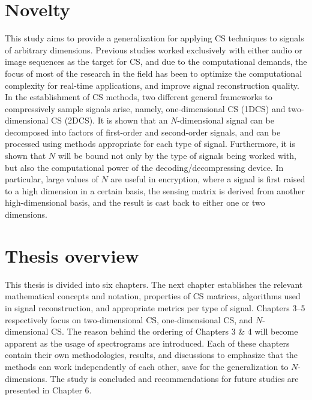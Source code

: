 \section{Novelty}
\label{sec:novel}
This study aims to provide a generalization for applying CS techniques to signals of arbitrary dimensions. Previous studies worked exclusively with either audio or image sequences as the target for CS, and due to the computational demands, the focus of most of the research in the field has been to optimize the computational complexity for real-time applications, and improve signal reconstruction quality. In the establishment of CS methods, two different general frameworks to compressively sample signals arise, namely, one-dimensional CS (1DCS) and two-dimensional CS (2DCS). It is shown that an $N$-dimensional signal can be decomposed into factors of first-order and second-order signals, and can be processed using methods appropriate for each type of signal. Furthermore, it is shown that $N$ will be bound not only by the type of signals being worked with, but also the computational power of the decoding/decompressing device. In particular, large values of $N$ are useful in encryption, where a signal is first raised to a high dimension in a certain basis, the sensing matrix is derived from another high-dimensional basis, and the result is cast back to either one or two dimensions.


\section{Thesis overview}
\label{sec:overview}
This thesis is divided into six chapters. The next chapter establishes the relevant mathematical concepts and notation, properties of CS matrices, algorithms used in signal reconstruction, and appropriate metrics per type of signal. Chapters 3--5 respectively focus on two-dimensional CS, one-dimensional CS, and $N$-dimensional CS. The reason behind the ordering of Chapters 3 \& 4 will become apparent as the usage of spectrograms are introduced. Each of these chapters contain their own methodologies, results, and discussions to emphasize that the methods can work independently of each other, save for the generalization to $N$-dimensions. The study is concluded and recommendations for future studies are presented in Chapter 6.